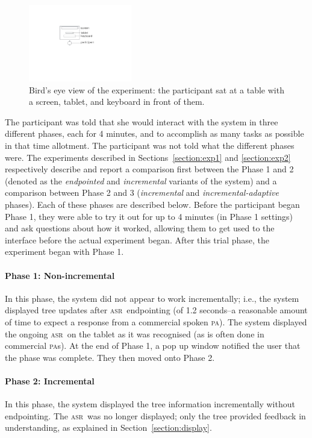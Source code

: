 \documentclass[11pt]{article}
\newcommand{\asr}[0]{\textsc{asr}}
\newcommand{\pa}[0]{\textsc{pa}}
\begin{document}
\begin{figure}[ht]
  \centering
      \includegraphics[width=0.4\textwidth]{figures/dataview.pdf}	
      \caption{Bird's eye view of the experiment: the participant sat at a table with a screen, tablet, and keyboard in front of them. \label{fig:dataview}}
\end{figure}

The participant was told that she would interact with the system in three different phases, each for 4 minutes, and to accomplish as many tasks as possible in that time allotment. The participant was not told what the different phases were. The experiments described in Sections~\ref{section:exp1} and \ref{section:exp2} respectively describe and report a comparison first between the Phase 1 and 2 (denoted as the \emph{endpointed} and \emph{incremental} variants of the system) and a comparison between Phase 2 and 3 (\emph{incremental} and \emph{incremental-adaptive} phases). Each of these phases are described below. Before the participant began Phase 1, they were able to try it out for up to 4 minutes (in Phase 1 settings) and ask questions about how it worked, allowing them to get used to the interface before the actual experiment began. After this trial phase, the experiment began with Phase 1.

\paragraph{Phase 1: Non-incremental} In this phase, the system did not appear to work incrementally; i.e., the system displayed tree updates after \asr\ endpointing (of 1.2 seconds--a reasonable amount of time to expect a response from a commercial spoken \pa). The system displayed the ongoing \asr\ on the tablet as it was recognised (as is often done in commercial \pa s). At the end of Phase 1, a pop up window notified the user that the phase was complete. They then moved onto Phase 2.

\paragraph{Phase 2: Incremental} In this phase, the system displayed the tree information incrementally without endpointing. The \asr\ was no longer displayed; only the tree provided feedback in understanding, as explained in Section~\ref{section:display}. 
\end{document}
